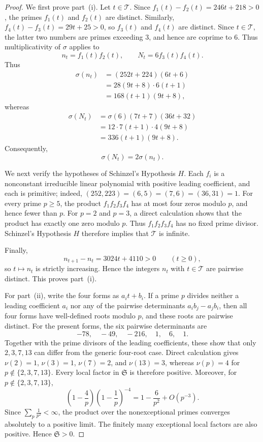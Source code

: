\documentclass[10pt,a4paper]{amsart}
\begin{document}
\begin{proof}
We first prove part~(i). Let $t\in\mathcal T$. Since
$f_1(t)-f_2(t)=246t+218>0$, the primes $f_1(t)$ and $f_2(t)$ are
distinct. Similarly, $f_4(t)-f_3(t)=29t+25>0$, so $f_3(t)$ and
$f_4(t)$ are distinct. Since $t\in\mathcal T$, the latter two
numbers are primes exceeding $3$, and hence are coprime to $6$.
Thus multiplicativity of $\sigma$ applies to
\[
n_t=f_1(t)f_2(t),
\qquad
N_t=6f_3(t)f_4(t).
\] Thus
\[
\begin{aligned}
\sigma(n_t)
&=(252t+224)(6t+6)\\
&=28(9t+8)\cdot6(t+1)\\
&=168(t+1)(9t+8),
\end{aligned}
\]
whereas
\[
\begin{aligned}
\sigma(N_t)
&=\sigma(6)(7t+7)(36t+32)\\
&=12\cdot7(t+1)\cdot4(9t+8)\\
&=336(t+1)(9t+8).
\end{aligned}
\]
Consequently,
\begin{equation}\label{eq:multiplier-two}
\sigma(N_t)=2\sigma(n_t).
\end{equation}

We next verify the hypotheses of Schinzel's Hypothesis $H$. Each
$f_i$ is a nonconstant irreducible linear polynomial with positive
leading coefficient, and each is primitive; indeed,
$(252,223)=(6,5)=(7,6)=(36,31)=1$. For every prime $p\ge5$, the
product $f_1f_2f_3f_4$ has at most four zeros modulo $p$, and hence
fewer than $p$. For $p=2$ and $p=3$, a direct calculation shows that
the product has exactly one zero modulo $p$. Thus $f_1f_2f_3f_4$ has no
fixed prime divisor. Schinzel's Hypothesis $H$ therefore implies that $\mathcal T$ is infinite.

Finally,
\[
n_{t+1}-n_t=3024t+4110>0\qquad(t\ge0),
\]
so $t\mapsto n_t$ is strictly increasing. Hence the integers $n_t$ with $t\in\mathcal T$ are pairwise distinct. This proves part~(i).

For part~(ii), write the four forms as $a_it+b_i$. If a prime $p$ divides neither a leading coefficient $a_i$ nor any of the pairwise determinants $a_ib_j-a_jb_i$, then all four forms have well-defined roots modulo $p$, and these roots are pairwise distinct. For the present forms, the six pairwise determinants are
\[
-78,\quad-49,\quad-216,\quad1,\quad6,\quad1.
\]
Together with the prime divisors of the leading coefficients, these
show that only $2,3,7,13$ can differ from the generic four-root case. Direct calculation gives
$\nu(2)=1$, $\nu(3)=1$, $\nu(7)=2$, and $\nu(13)=3$, whereas
$\nu(p)=4$ for $p\notin\{2,3,7,13\}$.
Every local factor in $\mathfrak S$ is therefore positive. Moreover, for $p\notin\{2,3,7,13\}$,
\[
\left(1-\frac4p\right)\left(1-\frac1p\right)^{-4}
=
1-\frac6{p^2}+O(p^{-3}).
\]
Since $\sum_p\frac1{p^2}<\infty$, the product over the nonexceptional primes converges absolutely to a positive limit. The finitely many exceptional local factors are also positive. Hence $\mathfrak S>0$.


\end{proof}
\end{document}
